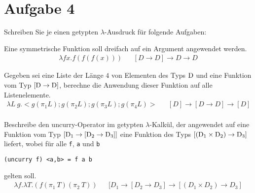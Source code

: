 \documentclass[ngerman,a4paper]{report}
\begin{document}
\section*{Aufgabe 4}
Schreiben Sie je einen getypten $\lambda$-Ausdruck für folgende Aufgaben:
\begin{compactenum}
\item Eine symmetrische Funktion soll dreifach auf ein Argument angewendet werden.
\begin{align*}
	\lambda fx.f(f(f(x)))&& [D \rightarrow D] \rightarrow D \rightarrow D
\end{align*}
\item Gegeben sei eine Liste der Länge $4$ von Elementen des Typs $\text{\lstinline!D!}$ und eine Funktion vom Typ $[\text{\lstinline!D!} \rightarrow \text{\lstinline!D!}]$, berechne die Anwendung dieser Funktion auf alle Listenelemente.
\begin{align*}
	\lambda L\ g.<g(\pi_1L);g(\pi_2L);g(\pi_3L);g(\pi_4L)>&& [D] \rightarrow [D\rightarrow D] \rightarrow [D]\\
\end{align*}
\item Beschreibe den uncurry-Operator im getypten $\lambda$-Kalkül, der angewendet auf eine Funktion vom Typ $[\text{\lstinline!D!}_1 \rightarrow [\text{\lstinline!D!}_2 \rightarrow \text{\lstinline!D!}_3]]$ eine Funktion des Typs $[(\text{\lstinline!D!}_1 \times \text{\lstinline!D!}_2) \rightarrow \text{\lstinline!D!}_3]$ liefert, wobei für alle \lstinline!f!, \lstinline!a! und \lstinline!b!
\begin{lstlisting}
(uncurry f) <a,b> = f a b
\end{lstlisting}
gelten soll.
\begin{align*}
	\lambda f. \lambda T.(f(\pi_1\ T) (\pi_2\ T))&& [D_1 \rightarrow [D_2 \rightarrow D_3] \rightarrow [(D_1\times D_2)\rightarrow D_3]
\end{align*}
\end{compactenum}
\end{document}
